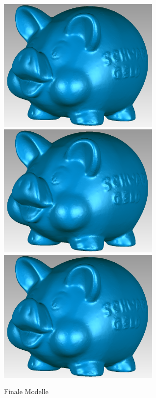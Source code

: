 \documentclass[]{article}
\begin{document}
\begin{figure}[!h]
\centering
\caption{Finale Modelle}
\includegraphics[width=80mm]{images/sparschwein/final} %
\includegraphics[width=80mm]{images/sparschwein/final} %
\includegraphics[width=80mm]{images/sparschwein/final}
\end{figure}
		
\end{document}
